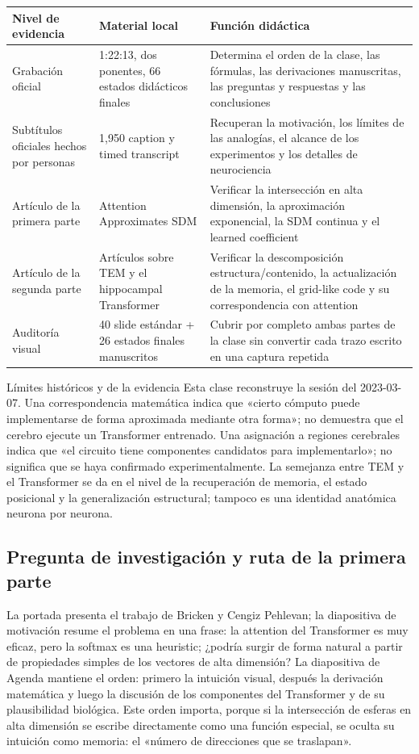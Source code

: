 \begin{longtable}{@{}L{0.18\textwidth}L{0.29\textwidth}L{0.41\textwidth}@{}}
\toprule
Nivel de evidencia & Material local & Función didáctica \\
\midrule
Grabación oficial & 1:22:13, dos ponentes, 66 estados didácticos finales & Determina el orden de la clase, las fórmulas, las derivaciones manuscritas, las preguntas y respuestas y las conclusiones \\
Subtítulos oficiales hechos por personas & 1,950 caption y timed transcript & Recuperan la motivación, los límites de las analogías, el alcance de los experimentos y los detalles de neurociencia \\
Artículo de la primera parte & Attention Approximates SDM & Verificar la intersección en alta dimensión, la aproximación exponencial, la SDM continua y el learned coefficient \\
Artículo de la segunda parte & Artículos sobre TEM y el hippocampal Transformer & Verificar la descomposición estructura/contenido, la actualización de la memoria, el grid-like code y su correspondencia con attention \\
Auditoría visual & 40 slide estándar + 26 estados finales manuscritos & Cubrir por completo ambas partes de la clase sin convertir cada trazo escrito en una captura repetida \\
\bottomrule
\end{longtable}

\begin{warningbox}{Límites históricos y de la evidencia}
Esta clase reconstruye la sesión del 2023-03-07. Una correspondencia matemática indica que «cierto cómputo puede implementarse de forma aproximada mediante otra forma»; no demuestra que el cerebro ejecute un Transformer entrenado. Una asignación a regiones cerebrales indica que «el circuito tiene componentes candidatos para implementarlo»; no significa que se haya confirmado experimentalmente. La semejanza entre TEM y el Transformer se da en el nivel de la recuperación de memoria, el estado posicional y la generalización estructural; tampoco es una identidad anatómica neurona por neurona.
\end{warningbox}

\subsection{Pregunta de investigación y ruta de la primera parte}

La portada presenta el trabajo de Bricken y Cengiz Pehlevan; la diapositiva de motivación resume el problema en una frase: la attention del Transformer es muy eficaz, pero la softmax es una heuristic; ¿podría surgir de forma natural a partir de propiedades simples de los vectores de alta dimensión? La diapositiva de Agenda mantiene el orden: primero la intuición visual, después la derivación matemática y luego la discusión de los componentes del Transformer y de su plausibilidad biológica. Este orden importa, porque si la intersección de esferas en alta dimensión se escribe directamente como una función especial, se oculta su intuición como memoria: el «número de direcciones que se traslapan».

